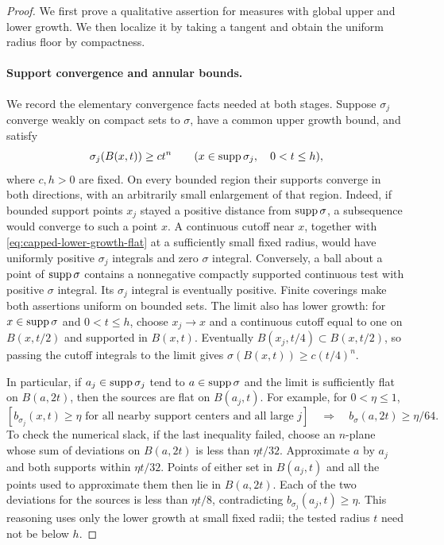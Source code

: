 \begin{proof}
We first prove a qualitative assertion for measures with global
upper and lower growth.  We then localize it by taking a tangent and
obtain the uniform radius floor by compactness.

\paragraph{Support convergence and annular bounds.}
We record the elementary convergence facts needed at both stages.
Suppose $\sigma_j$ converge weakly on compact sets to $\sigma$,
have a common upper growth bound, and satisfy
\begin{equation}\label{eq:capped-lower-growth-flat}
 \sigma_j(B(x,t))\geq c t^n
 \qquad(x\in\operatorname{supp}\sigma_j,\quad 0<t\leq h),
\end{equation}
where $c,h>0$ are fixed.  On every bounded region their supports
converge in both directions, with an arbitrarily small enlargement
of that region.  Indeed, if bounded support points $x_j$ stayed a
positive distance from $\operatorname{supp}\sigma$, a subsequence would converge
to such a point $x$.  A continuous cutoff near $x$, together with
\eqref{eq:capped-lower-growth-flat} at a sufficiently small fixed
radius, would have uniformly positive $\sigma_j$ integrals and
zero $\sigma$ integral.  Conversely, a ball about a point of
$\operatorname{supp}\sigma$ contains a nonnegative compactly supported
continuous test with positive $\sigma$ integral.  Its $\sigma_j$
integral is eventually positive.  Finite coverings make both
assertions uniform on bounded sets.  The limit also has lower growth:
for $x\in\operatorname{supp}\sigma$ and $0<t\leq h$, choose $x_j\to x$
and a continuous cutoff equal to one on $B(x,t/2)$ and supported
in $B(x,t)$.  Eventually $B(x_j,t/4)\subset B(x,t/2)$, so passing
the cutoff integrals to the limit gives
$\sigma(B(x,t))\geq c(t/4)^n$.

In particular, if $a_j\in\operatorname{supp}\sigma_j$ tend to
$a\in\operatorname{supp}\sigma$ and the limit is sufficiently flat on
$B(a,2t)$, then the sources are flat on $B(a_j,t)$.
For example, for $0<\eta\leq1$,
\begin{equation}\label{eq:nonflat-limit-flat}
 \left[ b_{\sigma_j}(x,t)\geq\eta
 \text{ for all nearby support centers and all large }j\right]
 \quad\Longrightarrow\quad
 b_\sigma(a,2t)\geq\eta/64.
\end{equation}
To check the numerical slack, if the last inequality failed, choose
an $n$-plane whose sum of deviations on $B(a,2t)$ is
less than $\eta t/32$.  Approximate $a$ by $a_j$ and both supports
within $\eta t/32$.  Points of either set in $B(a_j,t)$ and all
the points used to approximate them then lie in $B(a,2t)$.
Each of the two deviations for the sources is less than
$\eta t/8$, contradicting $b_{\sigma_j}(a_j,t)\geq\eta$.
This reasoning uses only the lower growth at small fixed radii;
the tested radius $t$ need not be below $h$.


\end{proof}
